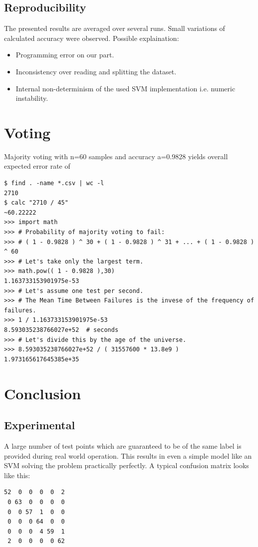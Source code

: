 \documentclass{article}
\begin{document}
\subsection{Reproducibility}
The presented results are averaged over several runs.
Small variations of calculated accuracy were observed.
Possible explaination:
\begin{itemize}
\item{Programming error on our part.}
\item{Inconsistency over reading and splitting the dataset.}
\item{Internal non-determinism of the used SVM implementation i.e. numeric instability.}
\end{itemize}


\section{Voting}
Majority voting with n=60 samples and accuracy a=0.9828 yields overall expected error rate of
\begin{verbatim}
$ find . -name *.csv | wc -l
2710
$ calc "2710 / 45"
~60.22222
>>> import math
>>> # Probability of majority voting to fail:
>>> # ( 1 - 0.9828 ) ^ 30 + ( 1 - 0.9828 ) ^ 31 + ... + ( 1 - 0.9828 ) ^ 60
>>> # Let's take only the largest term.
>>> math.pow(( 1 - 0.9828 ),30)
1.163733153901975e-53
>>> # Let's assume one test per second.
>>> # The Mean Time Between Failures is the invese of the frequency of failures.
>>> 1 / 1.163733153901975e-53
8.593035238766027e+52  # seconds
>>> # Let's divide this by the age of the universe.
>>> 8.593035238766027e+52 / ( 31557600 * 13.8e9 )
1.973165617645385e+35
\end{verbatim}


\section{Conclusion}
\subsection{Experimental}
A large number of test points which are guaranteed to be of the same label is provided during real world operation.
This results in even a simple model like an SVM solving the problem practically perfectly.
A typical confusion matrix looks like this:
\begin{verbatim}
52  0  0  0  0  2
 0 63  0  0  0  0
 0  0 57  1  0  0
 0  0  0 64  0  0
 0  0  0  4 59  1
 2  0  0  0  0 62
\end{verbatim}
\end{document}
